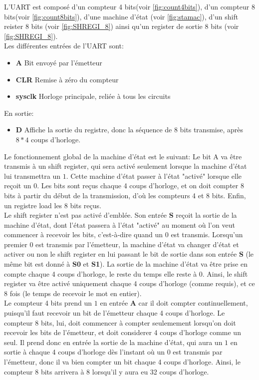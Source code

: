 \documentclass[a4paper]{article} %
\begin{document}
\begin{tcolorbox}[colframe=Monokaimagenta,colback=white]
L'UART est composé d'un compteur 4 bits(voir \ref{fig:count4bits}), d'un compteur 8 bits(voir \ref{fig:count8bits}), d'une machine d'état (voir \ref{fig:stamac}), d'un shift reister 8 bits (voir \ref{fig:SHREGI_8}) ainsi qu'un register de sortie 8 bits (voir \ref{fig:SHREGI_8}).\\    
Les différentes entrées de l'UART sont:
\begin{itemize}
    \item     \textbf{A} Bit envoyé par l'émetteur
    \item     \textbf{CLR} Remise à zéro du compteur
    \item     \textbf{sysclk} Horloge principale, reliée à tous les circuits
\end{itemize}
En sortie:
\begin{itemize}
    \item     \textbf{D} Affiche la sortie du registre, donc la séquence de 8 bits transmise, après $8*4$ coups d'horloge.
\end{itemize}
Le fonctionnement global de la machine d'état est le suivant:
Le bit A va être transmis à un shift register, qui sera activé seulement lorsque la machine d'état lui transmettra un $1$. Cette machine d'état passer à l'état "activé" lorsque elle reçoit un 0. Les bits sont reçus chaque 4 coups d'horloge, et on doit compter 8 bits à partir du début de la transmission, d'où les compteurs 4 et 8 bits. Enfin, un registre load les 8 bits reçus.\\
Le shift register n'est pas activé d'emblée. Son entrée \textbf{S} reçoit la sortie de la machine d'état, dont l'état passera à l'état "activé" au moment où l'on veut commencer à recevoir les bits, c'est-à-dire quand un $0$ est transmis.
Lorsqu'un premier $0$ est transmis par l'émetteur, la machine d'état va changer d'état et activer ou non le shift register en lui passant le bit de sortie dans son entrée \textbf{S} (le même bit est donné à \textbf{S0} et \textbf{S1}). La sortie de la machine d'état va être prise en compte chaque 4 coups d'horloge, le reste du temps elle reste à 0. Ainsi, le shift register va être activé uniquement chaque 4 coups d'horloge (comme requis), et ce 8 fois (le temps de recevoir le mot en entier).\\
Le compteur 4 bits prend un $1$ en entrée \textbf{A} car il doit compter continuellement, puisqu'il faut recevoir un bit de l'émetteur chaque 4 coups d'horloge. Le compteur 8 bits, lui, doit commencer à compter seulemement lorsqu'on doit recevoir les bits de l'émetteur, et doit considerer 4 coups d'horloge comme un seul. Il prend donc en entrée la sortie de la machine d'état, qui aura un $1$ en sortie à chaque 4 coups d'horloge dès l'instant où un 0 est transmis par l'émetteur, donc il va bien compter un bit chaque 4 coups d'horloge. Ainsi, le compteur 8 bits arrivera à 8 lorsqu'il y aura eu 32 coups d'horloge.\\

\end{tcolorbox}
\end{document}
